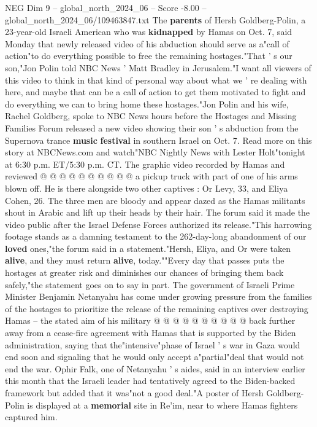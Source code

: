 \begin{textsample}{NEG Dim 9 – global\_north\_2024\_06 – Score -8.00 – global\_north\_2024\_06/109463847.txt}  \label{ex:f9_neg_163}
The \textbf{parents} of Hersh Goldberg-Polin, a 23-year-old Israeli American who was \textbf{kidnapped} by Hamas on Oct. 7, said Monday that newly released video of his abduction should serve as a"call of action"to do everything possible to free the remaining hostages."That ' s our son,"Jon Polin told NBC News ' Matt Bradley in Jerusalem."I want all viewers of this video to think in that kind of personal way about what we ' re dealing with here, and maybe that can be a call of action to get them motivated to fight and do everything we can to bring home these hostages."Jon Polin and his wife, Rachel Goldberg, spoke to NBC News hours before the Hostages and Missing Families Forum released a new video showing their son ' s abduction from the Supernova trance \textbf{music} \textbf{festival} in southern Israel on Oct. 7.
Read more on this story at NBCNews.com and watch"NBC Nightly News with Lester Holt"tonight at 6:30 p.m.
ET/5:30 p.m.
CT.
The graphic video recorded by Hamas and reviewed @ @ @ @ @ @ @ @ @ @ a pickup truck with part of one of his arms blown off.
He is there alongside two other captives : Or Levy, 33, and Eliya Cohen, 26.
The three men are bloody and appear dazed as the Hamas militants shout in Arabic and lift up their heads by their hair.
The forum said it made the video public after the Israel Defense Forces authorized its release."This harrowing footage stands as a damning testament to the 262-day-long abandonment of our \textbf{loved} ones,"the forum said in a statement."Hersh, Eliya, and Or were taken \textbf{alive}, and they must return \textbf{alive}, today.""Every day that passes puts the hostages at greater risk and diminishes our chances of bringing them back safely,"the statement goes on to say in part.
The government of Israeli Prime Minister Benjamin Netanyahu has come under growing pressure from the families of the hostages to prioritize the release of the remaining captives over destroying Hamas -- the stated aim of his military @ @ @ @ @ @ @ @ @ @ back further away from a cease-fire agreement with Hamas that is supported by the Biden administration, saying that the"intensive"phase of Israel ' s war in Gaza would end soon and signaling that he would only accept a"partial"deal that would not end the war.
Ophir Falk, one of Netanyahu ' s aides, said in an interview earlier this month that the Israeli leader had tentatively agreed to the Biden-backed framework but added that it was"not a good deal."A poster of Hersh Goldberg-Polin is displayed at a \textbf{memorial} site in Re'im, near to where Hamas fighters captured him.

\end{textsample}
